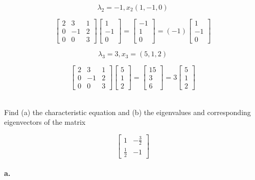 \documentclass{report}
\begin{document}
$$
\lambda_2 = -1,  x_2(1,-1,0)
$$

$$
\begin{bmatrix} 2 &3 & 1 \\ 0 & -1 & 2 \\ 0 & 0 & 3 \end{bmatrix} \begin{bmatrix} 1 \\ -1 \\ 0 \end{bmatrix} = \begin{bmatrix} - 1 \\ 1 \\ 0 \end{bmatrix} = (-1) \begin{bmatrix} 1 \\ -1 \\ 0 \end{bmatrix} 
$$

$$
\lambda_3 = 3, x_3 = (5,1,2)
$$

$$
\begin{bmatrix} 2 & 3 & 1 \\ 0 & -1 & 2 \\ 0 & 0 & 3 \end{bmatrix} \begin{bmatrix} 5 \\ 1 \\ 2 \end{bmatrix} = \begin{bmatrix} 15 \\ 3 \\ 6 \end{bmatrix} = 3 \begin{bmatrix} 5 \\ 1 \\ 2 \end{bmatrix} 
$$\\

\begin{tcolorbox}[colframe = lightred]
	
	Find (a) the characteristic equation and (b) the eigenvalues and corresponding eigenvectors of the matrix
	
	$$
	\begin{bmatrix} 1 & -\frac{3}{2} \\ \frac{1}{2} & -1 \end{bmatrix} 
	$$
\end{tcolorbox}

\paragraph{a.}
\end{document}
